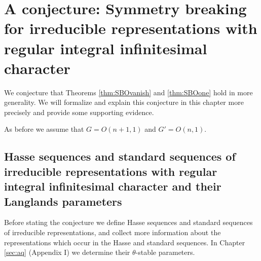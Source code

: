 \newpage
\section{A conjecture: Symmetry breaking for irreducible representations
 with regular integral infinitesimal character}
\label{sec:conjecture}


We conjecture that Theorems \ref{thm:SBOvanish} and \ref{thm:SBOone}
 hold  in more generality. 
We  will formalize and explain  this conjecture in this chapter more precisely and provide some supporting evidence.

As before we assume
that $G=O(n+1,1)$ and $G'=O(n,1)$.


\subsection{Hasse sequences and standard sequences
 of irreducible representations with regular integral infinitesimal character
 and their Langlands parameters} 
\label{subsec:Hasseps}


Before  stating the conjecture we define Hasse sequences and standard sequences  of irreducible representations, 
 and collect more information about the representations which occur in the Hasse and standard sequences.
In Chapter \ref{sec:aq} (Appendix I) we determine their $\theta$-stable parameters. 


